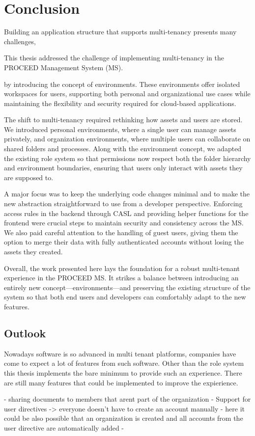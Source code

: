 \chapter{Conclusion}
\label{cha:conclusion}

Building an application structure that supports multi-tenancy presents many challenges,

This thesis addressed the challenge of implementing multi-tenancy in the PROCEED
Management System (MS).

by introducing the concept of environments. These environments
offer isolated workspaces for users, supporting both personal and organizational use cases
while maintaining the flexibility and security required for cloud-based applications.


The shift to multi-tenancy required rethinking how assets and users are stored. 
We introduced personal environments, where a single user can manage assets privately, and
organization environments, where multiple users can collaborate on shared folders and
processes. 
Along with the environment concept, we adapted the existing role system so that
permissions now respect both the folder hierarchy and environment boundaries, ensuring
that users only interact with assets they are supposed to.

A major focus was to keep the underlying code changes minimal and 
to make the new abstraction straightforward to use from a developer perspective.
Enforcing access rules in the backend through CASL and providing helper functions for the
frontend were crucial steps to maintain security and consistency across the MS.
We also paid careful attention to the handling of guest users, giving them the option to merge
their data with fully authenticated accounts without losing the assets they created.

Overall, the work presented here lays the foundation for a robust multi-tenant experience in the PROCEED MS. It strikes a balance between introducing an entirely new concept—environments—and preserving the existing structure of the system so that both end users and developers can comfortably adapt to the new features.







\section{Outlook}
\label{cha:outlook}

Nowadays software is so advanced in multi tenant platforms, companies have come to expect
a lot of features from such software.
Other than the role system this thesis implements the bare minimum to provide such an
experience.
There are still many features that could be implemented to improve the expierience.

- sharing documents to members that arent part of the organization
- Support for user directives -> everyone doesn't have to create an account manually
  - here it could be also possible that an organization is created and all accounts from
    the user directive are automatically added 
-
